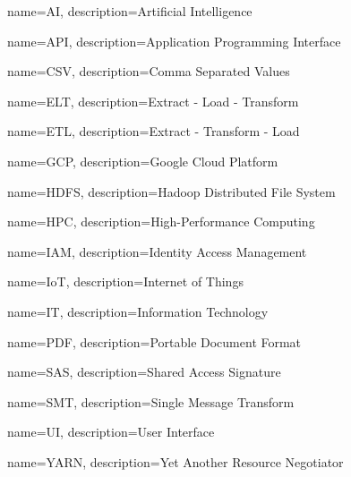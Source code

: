 \makeglossaries

{
    name=AI,
    description={Artificial Intelligence}
}

{
    name=API,
    description={Application Programming Interface}
}

{
    name=CSV,
    description={Comma Separated Values}
}

{
    name=ELT,
    description={Extract - Load - Transform}
}

{
    name=ETL,
    description={Extract - Transform - Load}
}

{
    name=GCP,
    description={Google Cloud Platform}
}

{
    name=HDFS,
    description={Hadoop Distributed File System}
}

{
    name=HPC,
    description={High-Performance Computing}
}

{
    name=IAM,
    description={Identity Access Management}
}

{
    name=IoT,
    description={Internet of Things}
}

{
    name=IT,
    description={Information Technology}
}

{
    name=PDF,
    description={Portable Document Format}
}

{
    name=SAS,
    description={Shared Access Signature}
}

{
    name=SMT,
    description={Single Message Transform}
}

{
    name=UI,
    description={User Interface}
}

{
    name=YARN,
    description={Yet Another Resource Negotiator}
}
